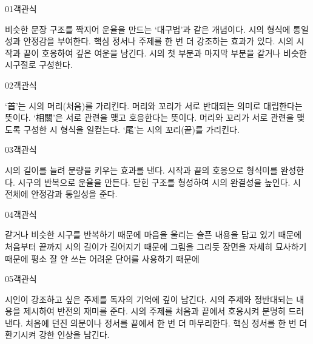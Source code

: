 \documentclass[fs85,seriesRus]{korfarm-base}
\begin{document}

\par\medskip
\kfBeginMC
\begin{kfQBlock}{01}{객관식}
\begin{kfChoices}
\kfChoice 비슷한 문장 구조를 짝지어 운율을 만드는 ‘대구법’과 같은 개념이다.
\kfChoice 시의 형식에 통일성과 안정감을 부여한다.
\kfChoice 핵심 정서나 주제를 한 번 더 강조하는 효과가 있다.
\kfChoice 시의 시작과 끝이 호응하여 깊은 여운을 남긴다.
\kfChoice 시의 첫 부분과 마지막 부분을 같거나 비슷한 시구절로 구성한다.
\end{kfChoices}
\end{kfQBlock}
\begin{kfQBlock}{02}{객관식}
\begin{kfChoices}
\kfChoice ‘首’는 시의 머리(처음)를 가리킨다.
\kfChoice 머리와 꼬리가 서로 반대되는 의미로 대립한다는 뜻이다.
\kfChoice ‘相關’은 서로 관련을 맺고 호응한다는 뜻이다.
\kfChoice 머리와 꼬리가 서로 관련을 맺도록 구성한 시 형식을 일컫는다.
\kfChoice ‘尾’는 시의 꼬리(끝)를 가리킨다.
\end{kfChoices}
\end{kfQBlock}
\begin{kfQBlock}{03}{객관식}
\begin{kfChoices}
\kfChoice 시의 길이를 늘려 분량을 키우는 효과를 낸다.
\kfChoice 시작과 끝의 호응으로 형식미를 완성한다.
\kfChoice 시구의 반복으로 운율을 만든다.
\kfChoice 닫힌 구조를 형성하여 시의 완결성을 높인다.
\kfChoice 시 전체에 안정감과 통일성을 준다.
\end{kfChoices}
\end{kfQBlock}
\begin{kfQBlock}{04}{객관식}
\begin{kfChoices}
\kfChoice 같거나 비슷한 시구를 반복하기 때문에
\kfChoice 마음을 울리는 슬픈 내용을 담고 있기 때문에
\kfChoice 처음부터 끝까지 시의 길이가 길어지기 때문에
\kfChoice 그림을 그리듯 장면을 자세히 묘사하기 때문에
\kfChoice 평소 잘 안 쓰는 어려운 단어를 사용하기 때문에
\end{kfChoices}
\end{kfQBlock}
\begin{kfQBlock}{05}{객관식}
\begin{kfChoices}
\kfChoice 시인이 강조하고 싶은 주제를 독자의 기억에 깊이 남긴다.
\kfChoice 시의 주제와 정반대되는 내용을 제시하여 반전의 재미를 준다.
\kfChoice 시의 주제를 처음과 끝에서 호응시켜 분명히 드러낸다.
\kfChoice 처음에 던진 의문이나 정서를 끝에서 한 번 더 마무리한다.
\kfChoice 핵심 정서를 한 번 더 환기시켜 강한 인상을 남긴다.
\end{kfChoices}
\end{kfQBlock}
\end{document}
